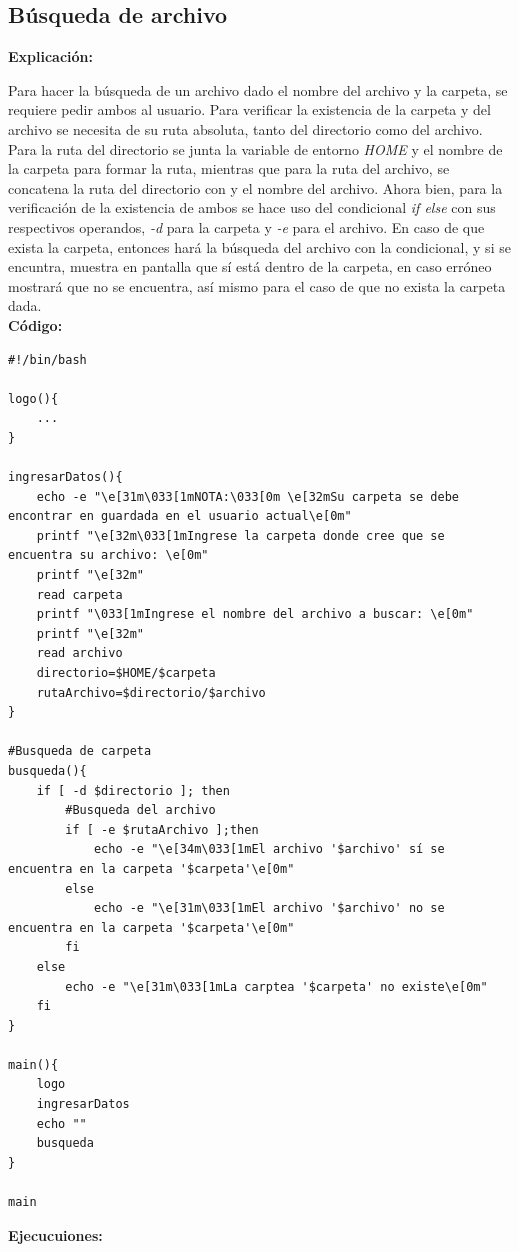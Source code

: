 \documentclass[letter,12pt]{article} %
\begin{document}
\subsection{Búsqueda de archivo}
\textbf{Explicación:} \par
\vspace{0.3cm}
Para hacer la búsqueda de un archivo dado el nombre del archivo y la carpeta, se requiere pedir ambos al usuario. Para verificar la existencia de la carpeta y del archivo se necesita de su ruta absoluta, tanto del directorio como del archivo. Para la ruta del directorio se junta la variable de entorno \textit{\textdollar HOME} y el nombre de la carpeta para formar la ruta, mientras que para la ruta del archivo, se concatena la ruta del directorio con y el nombre del archivo. Ahora bien, para la verificación de la existencia de ambos se hace uso del condicional \textit{if else} con sus respectivos operandos, \textit{-d} para la carpeta y \textit{-e} para el archivo. En caso de que exista la carpeta, entonces hará la búsqueda del archivo con la condicional, y si se encuntra, muestra en pantalla que sí está dentro de la carpeta, en caso erróneo mostrará que no se encuentra, así mismo para el caso de que no exista la carpeta dada.\\
\newpage
\textbf{Código:} \par
\begin{lstlisting}[style=BashInputStyle]
#!/bin/bash

logo(){
    ...
}

ingresarDatos(){
    echo -e "\e[31m\033[1mNOTA:\033[0m \e[32mSu carpeta se debe encontrar en guardada en el usuario actual\e[0m"
    printf "\e[32m\033[1mIngrese la carpeta donde cree que se encuentra su archivo: \e[0m"
    printf "\e[32m"
    read carpeta
    printf "\033[1mIngrese el nombre del archivo a buscar: \e[0m"
    printf "\e[32m"
    read archivo
    directorio=$HOME/$carpeta
    rutaArchivo=$directorio/$archivo
}

#Busqueda de carpeta 
busqueda(){
    if [ -d $directorio ]; then
        #Busqueda del archivo
        if [ -e $rutaArchivo ];then
            echo -e "\e[34m\033[1mEl archivo '$archivo' sí se encuentra en la carpeta '$carpeta'\e[0m"  
        else
            echo -e "\e[31m\033[1mEl archivo '$archivo' no se encuentra en la carpeta '$carpeta'\e[0m"
        fi  
    else 
        echo -e "\e[31m\033[1mLa carptea '$carpeta' no existe\e[0m"
    fi
}

main(){
    logo
    ingresarDatos
    echo ""
    busqueda
}

main
\end{lstlisting}
\newpage
\textbf{Ejecucuiones:} \par
\end{document}
